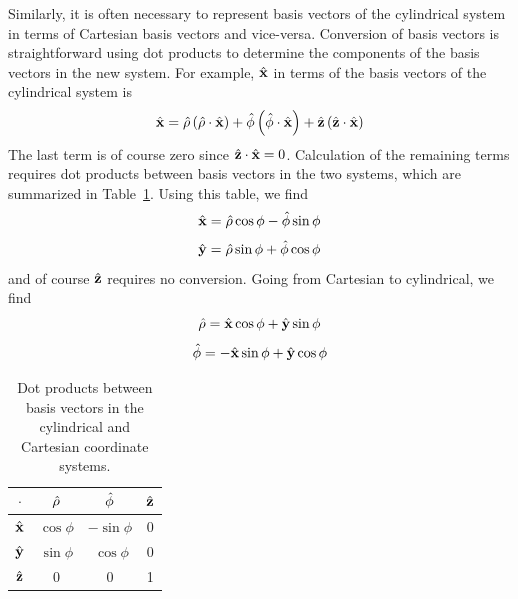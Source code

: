 Similarly, it is often necessary to represent basis vectors of the cylindrical system in terms of Cartesian basis vectors and vice-versa.
Conversion of basis vectors is straightforward using dot products to determine the components of the basis vectors in the new system. 
For example, $\hat{\bf x}$ in terms of the basis vectors of the cylindrical system is
%
\begin{equation}
\hat{\bf x} = \hat{\bf \rho}\left(\hat{\bf \rho}\cdot\hat{\bf x}\right) 
             +\hat{\bf \phi}\left(\hat{\bf \phi}\cdot\hat{\bf x}\right)
             +\hat{\bf z   }\left(\hat{\bf    z}\cdot\hat{\bf x}\right)
\end{equation}
%
The last term is of course zero since $\hat{\bf z}\cdot\hat{\bf x}=0$.
Calculation of the remaining terms requires dot products between basis vectors in the two systems, which are summarized in Table~\ref{m0096_tBasisVectorConversion}.
Using this table, we find
%
\begin{equation}
\hat{\bf x} = \hat{\bf \rho}\cos\phi
             -\hat{\bf \phi}\sin\phi
\end{equation}
%
\begin{equation}
\hat{\bf y} = \hat{\bf \rho}\sin\phi
             +\hat{\bf \phi}\cos\phi
\end{equation}
%
and of course $\hat{\bf z}$ requires no conversion.  Going from Cartesian to cylindrical, we find
%
\begin{equation}
\hat{\bf \rho} = \hat{\bf x}\cos\phi
                +\hat{\bf y}\sin\phi
\end{equation}
%
\begin{equation}
\hat{\bf \phi} =-\hat{\bf x}\sin\phi
                +\hat{\bf y}\cos\phi
\end{equation}
%
\begin{table}
\begin{center}
\begin{tabular}{c|ccc}
$\cdot$       & $\hat{\bf \rho}$ & $\hat{\bf \phi}$ & $\hat{\bf z}$ \\
\hline
$\hat{\bf x}$ & $\cos\phi$       & $-\sin\phi$      & 0 \\
$\hat{\bf y}$ & $\sin\phi$       & $~\cos\phi$      & 0 \\
$\hat{\bf z}$ & 0              & 0              & 1 \\
\end{tabular}
\end{center}
\caption{\label{m0096_tBasisVectorConversion}Dot products between basis vectors in the cylindrical and Cartesian coordinate systems.}
\end{table}

